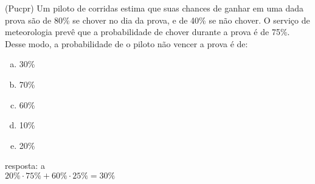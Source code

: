 \begin{ex}
 (Pucpr) Um piloto de corridas estima que suas chances de ganhar em uma dada prova são de 80\% se chover no dia da prova, e de 40\% se não chover. O serviço de meteorologia prevê que a probabilidade de chover durante a prova é de 75\%. Desse modo, a probabilidade de o piloto não vencer a prova é de:
   \begin{enumerate}[(a)]
   \item 30\%
   \item 70\%
   \item 60\%
   \item 10\%
   \item 20\%
   \end{enumerate}
     \begin{sol}
      resposta: a \\
      $20\%\cdot 75\% + 60\%\cdot 25\%=30\%$
     \end{sol}
\end{ex}